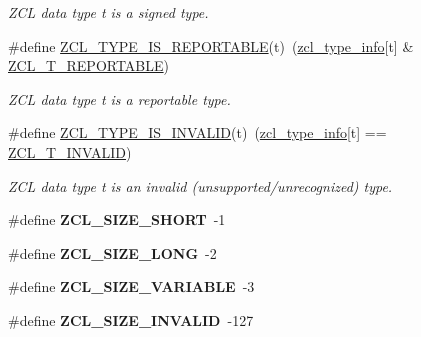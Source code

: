 \begin{DoxyCompactItemize}
\begin{DoxyCompactList}\small\item\em Z\-C\-L data type {\itshape t} is a signed type. \end{DoxyCompactList}\item 
\hypertarget{group__zcl__types_ga665e39b52fa49df456f3e218dbb3c3e0}{\#define \hyperlink{group__zcl__types_ga665e39b52fa49df456f3e218dbb3c3e0}{Z\-C\-L\-\_\-\-T\-Y\-P\-E\-\_\-\-I\-S\-\_\-\-R\-E\-P\-O\-R\-T\-A\-B\-L\-E}(t)~(\hyperlink{group__zcl__types_ga0f5737f60f1f37fb3b375e9fd5fe664d}{zcl\-\_\-type\-\_\-info}\mbox{[}t\mbox{]} \& \hyperlink{group__zcl__types_gab0e5c23a0877c17fde12043c85728c29}{Z\-C\-L\-\_\-\-T\-\_\-\-R\-E\-P\-O\-R\-T\-A\-B\-L\-E})}\label{group__zcl__types_ga665e39b52fa49df456f3e218dbb3c3e0}

\begin{DoxyCompactList}\small\item\em Z\-C\-L data type {\itshape t} is a reportable type. \end{DoxyCompactList}\item 
\hypertarget{group__zcl__types_ga639712ec7549d1bb6a5bcb05097386e2}{\#define \hyperlink{group__zcl__types_ga639712ec7549d1bb6a5bcb05097386e2}{Z\-C\-L\-\_\-\-T\-Y\-P\-E\-\_\-\-I\-S\-\_\-\-I\-N\-V\-A\-L\-I\-D}(t)~(\hyperlink{group__zcl__types_ga0f5737f60f1f37fb3b375e9fd5fe664d}{zcl\-\_\-type\-\_\-info}\mbox{[}t\mbox{]} == \hyperlink{group__zcl__types_ga7609ed68cf4399cb2c09799ecedfdbe0}{Z\-C\-L\-\_\-\-T\-\_\-\-I\-N\-V\-A\-L\-I\-D})}\label{group__zcl__types_ga639712ec7549d1bb6a5bcb05097386e2}

\begin{DoxyCompactList}\small\item\em Z\-C\-L data type {\itshape t} is an invalid (unsupported/unrecognized) type. \end{DoxyCompactList}\item 
\hypertarget{group__zcl__types_ga755a7e3f73663a35fc1f702956dfca85}{\#define {\bfseries Z\-C\-L\-\_\-\-S\-I\-Z\-E\-\_\-\-S\-H\-O\-R\-T}~-\/1}\label{group__zcl__types_ga755a7e3f73663a35fc1f702956dfca85}

\item 
\hypertarget{group__zcl__types_ga74ee31f6a58ad03535546050d04a0de1}{\#define {\bfseries Z\-C\-L\-\_\-\-S\-I\-Z\-E\-\_\-\-L\-O\-N\-G}~-\/2}\label{group__zcl__types_ga74ee31f6a58ad03535546050d04a0de1}

\item 
\hypertarget{group__zcl__types_ga8b41a3880f93b53bbae1e241aac4bdb2}{\#define {\bfseries Z\-C\-L\-\_\-\-S\-I\-Z\-E\-\_\-\-V\-A\-R\-I\-A\-B\-L\-E}~-\/3}\label{group__zcl__types_ga8b41a3880f93b53bbae1e241aac4bdb2}

\item 
\hypertarget{group__zcl__types_ga18098b4db5dd09f98fdcb5db15cff375}{\#define {\bfseries Z\-C\-L\-\_\-\-S\-I\-Z\-E\-\_\-\-I\-N\-V\-A\-L\-I\-D}~-\/127}\label{group__zcl__types_ga18098b4db5dd09f98fdcb5db15cff375}

\end{DoxyCompactItemize}
